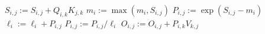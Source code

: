 \documentclass{standalone}
\begin{document}
\begin{varwidth}{\linewidth}

\begin{algorithmic}
  \ForAll{$i,j \in [0,N) \times [0,N)$}
    \For {$k \in [0,d)$}
      \State $S_{i,j} := S_{i,j} + Q_{i,k} K_{j,k}$
    \EndFor
  \EndFor
  \ForAll{$i \in [0,N)$}
    \For {$j \in [0,N)$}
      \State $m_{i} := \max(m_{i}, S_{i,j})$
    \EndFor
  \EndFor
  \ForAll{$i \in [0,N)$}
    \For {$j \in [0,N)$}
      \State $P_{i,j} := \exp(S_{i,j} - m_i)$
      \State $\ell_i := \ell_i + P_{i,j}$
    \EndFor
    $P_{i,j} := P_{i,j} / \ell_i$
  \EndFor
  \ForAll{$i,j \in [0,N) \times [0,d)$}
    \For {$k \in [0,N)$}
      \State $O_{i,j} := O_{i,j} + P_{i,k} V_{k,j}$
    \EndFor
  \EndFor
\end{algorithmic}

\end{varwidth}
\end{document}
